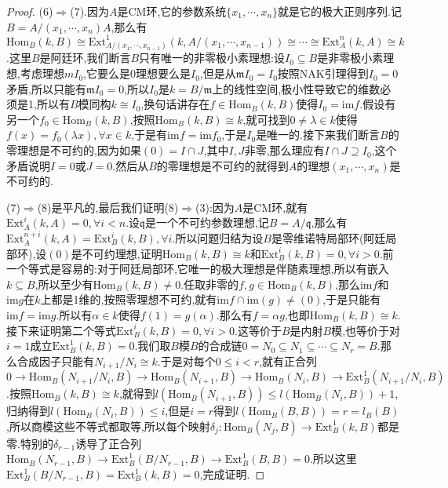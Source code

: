 \begin{proof}
	(6)$\Rightarrow$(7).因为$A$是CM环,它的参数系统$\{x_1,\cdots,x_n\}$就是它的极大正则序列.记$B=A/(x_1,\cdots,x_n)A$,那么有$\mathrm{Hom}_B(k,B)\cong\mathrm{Ext}_{A/(x_1,\cdots,x_{n-1})}^1(k,A/(x_1,\cdots,x_{n-1}))\cong\cdots\cong\mathrm{Ext}_A^n(k,A)\cong k$.这里$B$是阿廷环,我们断言$B$只有唯一的非零极小素理想:设$I_0\subseteq B$是非零极小素理想,考虑理想$mI_0$,它要么是0理想要么是$I_0$,但是从$\mathfrak{m}I_0=I_0$按照NAK引理得到$I_0=0$矛盾,所以只能有$\mathfrak{m}I_0=0$,所以$I_0$是$k=B/\mathfrak{m}$上的线性空间,极小性导致它的维数必须是1,所以有$B$模同构$k\cong I_0$,换句话讲存在$f\in\mathrm{Hom}_B(k,B)$使得$I_0=\mathrm{im}f$.假设有另一个$f_0\in\mathrm{Hom}_B(k,B)$,按照$\mathrm{Hom}_B(k,B)\cong k$,就可找到$0\not=\lambda\in k$使得$f(x)=f_0(\lambda x),\forall x\in k$,于是有$\mathrm{im}f=\mathrm{im}f_0$,于是$I_0$是唯一的.接下来我们断言$B$的零理想是不可约的,因为如果$(0)=I\cap J$,其中$I,J$非零,那么理应有$I\cap J\supseteq I_0$,这个矛盾说明$I=0$或$J=0$.然后从$B$的零理想是不可约的就得到$A$的理想$(x_1,\cdots,x_n)$是不可约的.
	
	\qquad
	
	(7)$\Rightarrow$(8)是平凡的,最后我们证明(8)$\Rightarrow$(3):因为$A$是CM环,就有$\mathrm{Ext}_A^i(k,A)=0,\forall i<n$.设$\mathfrak{q}$是一个不可约参数理想,记$B=A/\mathfrak{q}$,那么有$\mathrm{Ext}_A^{n+i}(k,A)=\mathrm{Ext}_B^i(k,B),\forall i$.所以问题归结为设$B$是零维诺特局部环(阿廷局部环),设$(0)$是不可约理想,证明$\mathrm{Hom}_B(k,B)\cong k$和$\mathrm{Ext}_B^i(k,B)=0,\forall i>0$.前一个等式是容易的:对于阿廷局部环,它唯一的极大理想是伴随素理想,所以有嵌入$k\subseteq B$,所以至少有$\mathrm{Hom}_B(k,B)\not=0$.任取非零的$f,g\in\mathrm{Hom}_B(k,B)$,那么$\mathrm{im}f$和$\mathrm{im}g$在$k$上都是1维的,按照零理想不可约,就有$\mathrm{im}f\cap\mathrm{im}(g)\not=(0)$,于是只能有$\mathrm{im}f=\mathrm{im}g$.所以有$\alpha\in k$使得$f(1)=g(\alpha)$.那么有$f=\alpha g$,也即$\mathrm{Hom}_B(k,B)\cong k$.接下来证明第二个等式$\mathrm{Ext}_B^i(k,B)=0,\forall i>0$.这等价于$B$是内射$B$模,也等价于对$i=1$成立$\mathrm{Ext}_B^1(k,B)=0$.我们取$B$模$B$的合成链$0=N_0\subseteq N_1\subseteq\cdots\subseteq N_r=B$.那么合成因子只能有$N_{i+1}/N_i\cong k$.于是对每个$0\le i<r$,就有正合列$0\to\mathrm{Hom}_B(N_{i+1}/N_i,B)\to\mathrm{Hom}_B(N_{i+1},B)\to\mathrm{Hom}_B(N_i,B)\to\mathrm{Ext}_B^1(N_{i+1}/N_i,B)$.按照$\mathrm{Hom}_B(k,B)\cong k$,就得到$l(\mathrm{Hom}_B(N_{i+1},B))\le l(\mathrm{Hom}_B(N_i,B))+1$,归纳得到$l(\mathrm{Hom}_B(N_i,B))\le i$,但是$i=r$得到$l(\mathrm{Hom}_B(B,B))=r=l_B(B)$,所以商模这些不等式都取等,所以每个映射$\delta_j:\mathrm{Hom}_B(N_j,B)\to\mathrm{Ext}_B^1(k,B)$都是零.特别的$\delta_{r-1}$诱导了正合列$\mathrm{Hom}_B(N_{r-1},B)\to\mathrm{Ext}_B^1(B/N_{r-1},B)\to\mathrm{Ext}_B^1(B,B)=0$.所以这里$\mathrm{Ext}_B^1(B/N_{r-1},B)=\mathrm{Ext}_B^1(k,B)=0$,完成证明.
\end{proof}

